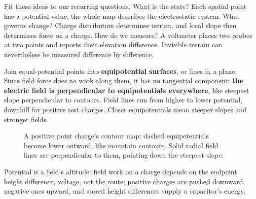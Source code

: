 \begin{mainline}
Fit these ideas to our recurring questions. What is the state? Each spatial point has a potential value; the whole map describes the electrostatic system. What governs change? Charge distribution determines terrain, and local slope then determines force on a charge. How do we measure? A voltmeter places two probes at two points and reports their elevation difference. Invisible terrain can nevertheless be measured difference by difference.

Join equal-potential points into \textbf{equipotential surfaces}, or lines in a plane. Since field force does no work along them, it has no tangential component: \textbf{the electric field is perpendicular to equipotentials everywhere}, like steepest slope perpendicular to contours. Field lines run from higher to lower potential, downhill for positive test charges. Closer equipotentials mean steeper slopes and stronger fields.
\end{mainline}

\begin{figure}[htbp]
\centering
{}
\caption{A positive point charge's contour map: dashed equipotentials become lower outward, like mountain contours. Solid radial field lines are perpendicular to them, pointing down the steepest slope.}
\end{figure}


\begin{oneline}
Potential is a field's altitude: field work on a charge depends on the endpoint height difference, voltage, not the route; positive charges are pushed downward, negative ones upward, and stored height differences supply a capacitor's energy.
\end{oneline}


